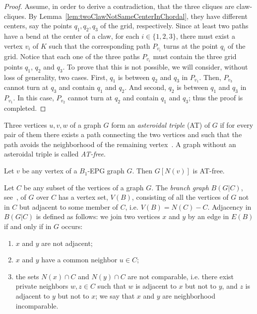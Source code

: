 \begin{proof}
Assume, in order to derive a contradiction, that the three cliques are claw-cliques. By Lemma~\ref{lem:twoClawNotSameCenterInChordal}, they have different centers, say the points $q_1, q_2, q_3$ of the grid, respectively. Since at least two paths have a bend at the center of a claw, for each $i\in\{1,2,3\}$,   there must exist a vertex
  $v_i$ of $K$ such that the corresponding path $P_{v_i}$ turns at the point $q_i$ of the grid.  Notice that each one of the three paths $P_{v_i}$
  must contain  the three grid points $q_1$, $q_2$ and $q_3$. To prove that this is not possible, we will consider, without loss of generality, two cases.
  First,  $q_1$ is between $q_2$ and $q_3$ in $P_{v_1}$. Then, $P_{v_3}$ cannot turn at $q_3$ and contain $q_1$ and $q_2$.   And second,
  $q_2$ is between $q_1$ and $q_3$ in $P_{v_1}$. In this case, $P_{v_2}$ cannot turn at $q_2$ and contain $q_1$ and $q_3$; thus the proof is completed.
\end{proof}

Three vertices $u, v, w$ of a graph $G$ form an \textit{asteroidal triple} (AT) of $G$ if for every pair of them there exists a path connecting the two vertices and such that the path avoids the neighborhood of the remaining vertex~\cite{Asinowski2009}. A graph without an asteroidal triple is called \textit{AT-free}. 

\begin{lema}
 \label{l:AT-free} Let $v$ be any vertex of a $B_1$-EPG graph $G$. Then $G[N(v)]$ is AT-free.
\end{lema}

Let $C$ be any subset of the vertices of a graph $G$. The \textit{branch graph} $B(G|C)$, see~\cite{golumbic2009}, of $G$ over $C$ has a vertex set, $V(B)$, consisting of all the vertices of $G$ not in $C$ but adjacent to some member of $C$, i.e. $V(B) = N(C) - C$. Adjacency in $B(G|C)$ is defined as follows: we join two vertices $x$ and $y$ by an edge in $E(B)$ if and only if in $G$ occurs:
\begin{enumerate}
    \item  $x$ and $y$ are not adjacent;
    \item $x$ and $y$ have a common neighbor $u \in C$;
    \item the sets $N(x) \cap C$ and $N(y) \cap C$ are not comparable, i.e. there exist private neighbors $w, z \in C$ such that $w$ is adjacent to $x$ but not to $y$, and $z$ is adjacent to $y$ but not to $x$; we say that $x$ and $y$ are neighborhood incomparable.
\end{enumerate}

